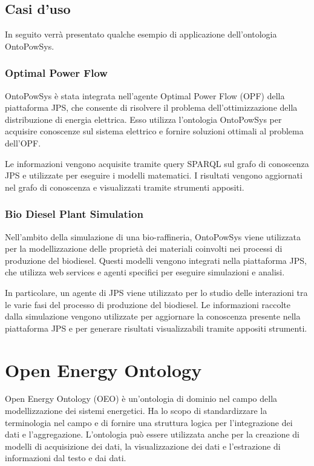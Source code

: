 \subsection{Casi d'uso}
In seguito verrà presentato qualche esempio di applicazione dell'ontologia
OntoPowSys.

\subsubsection{Optimal Power Flow}
OntoPowSys è stata integrata nell'agente Optimal Power Flow (OPF) della
piattaforma JPS, che consente di risolvere il problema dell'ottimizzazione
della distribuzione di energia elettrica. Esso utilizza l'ontologia
OntoPowSys per acquisire conoscenze sul sistema elettrico e fornire soluzioni
ottimali al problema dell'OPF.

Le informazioni vengono acquisite tramite query
SPARQL sul grafo di conoscenza JPS e utilizzate per eseguire i modelli
matematici. I risultati vengono aggiornati nel grafo di conoscenza e
visualizzati tramite strumenti appositi.

\subsubsection{Bio Diesel Plant Simulation}
Nell'ambito della simulazione di una bio-raffineria, OntoPowSys viene
utilizzata per la modellizzazione delle proprietà dei materiali coinvolti nei
processi di produzione del biodiesel. Questi modelli vengono integrati nella
piattaforma JPS, che utilizza web services e agenti specifici per eseguire
simulazioni e analisi.

In particolare, un agente di JPS viene utilizzato per lo
studio delle interazioni tra le varie fasi del processo di produzione del
biodiesel. Le informazioni raccolte dalla simulazione vengono utilizzate per
aggiornare la conoscenza presente nella piattaforma JPS e per generare
risultati visualizzabili tramite appositi strumenti.

\section{Open Energy Ontology}
Open Energy Ontology \cite{OpenEnergyOntology} (OEO) è un'ontologia di dominio
nel campo della
modellizzazione dei sistemi energetici. Ha lo scopo di standardizzare la
terminologia nel campo e di fornire una struttura logica per l'integrazione dei
dati e l'aggregazione. L'ontologia può essere utilizzata anche per la creazione
di modelli di acquisizione dei dati, la visualizzazione dei dati e l'estrazione
di informazioni dal testo e dai dati.

